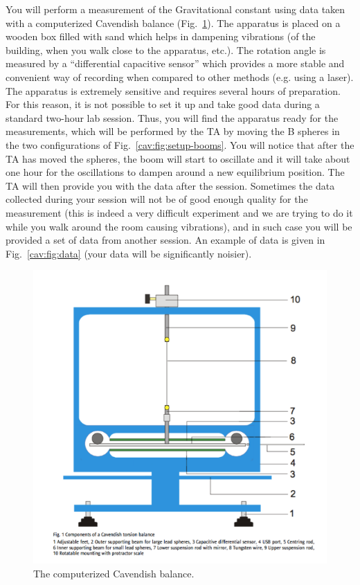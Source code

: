 You will perform a measurement of the Gravitational constant using data taken with a
computerized Cavendish balance (Fig.~\ref{cav:fig:comp-setup}). The apparatus is placed on a wooden box filled
with sand which helps in dampening vibrations (of the building, when you walk close to
the apparatus, etc.). The rotation angle is measured by a ``differential capacitive sensor''
which provides a more stable and convenient way of recording when compared to other
methods (e.g. using a laser). The apparatus is extremely sensitive and requires several
hours of preparation. For this reason, it is not possible to set it up and take good data
during a standard two-hour lab session. Thus, you will find the apparatus ready for the
measurements, which will be performed by the TA by moving the B spheres in the two
configurations of Fig.~\ref{cav:fig:setup-booms}. You will notice that after the TA has moved the spheres, the
boom will start to oscillate and it will take about one hour for the oscillations to dampen
around a new equilibrium position. The TA will then provide you with the data after the
session. Sometimes the data collected during your session will not be of good enough
quality for the measurement (this is indeed a very difficult experiment and we are trying
to do it while you walk around the room causing vibrations), and in such case you will
be provided a set of data from another session. An example of data is given in Fig.~\ref{cav:fig:data}
(your data will be significantly noisier).

\begin{figure}
	\centering
	\includegraphics[width=\textwidth]{cavendish/tel-rp2111-setup}
	\caption{The computerized Cavendish balance.}\label{cav:fig:comp-setup}
\end{figure}

